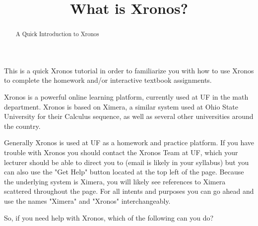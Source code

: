 \documentclass{ximera}
\title{What is Xronos?}
\begin{document}
\begin{abstract}
    A Quick Introduction to Xronos
\end{abstract}
\maketitle

This is a quick Xronos tutorial in order to familiarize you with how to use Xronos to complete the homework and/or interactive textbook assignments.

Xronos is a powerful online learning platform, currently used at UF in the math department. Xronos is based on Ximera, a similar system used at Ohio State University for their Calculus sequence, as well as several other universities around the country.

Generally Xronos is used at UF as a homework and practice platform. If you have trouble with Xronos you should contact the Xronos Team at UF, which your lecturer should be able to direct you to (email is likely in your syllabus) but you can also use the "Get Help" button located at the top left of the page. Because the underlying system is Ximera, you will likely see references to Ximera scattered throughout the page. For all intents and purposes you can go ahead and use the names "Ximera" and "Xronos" interchangeably.

\begin{question}
    So, if you need help with Xronos, which of the following can you do?
    
    \begin{selectAll}
    \end{selectAll}
\end{question}
\end{document}
